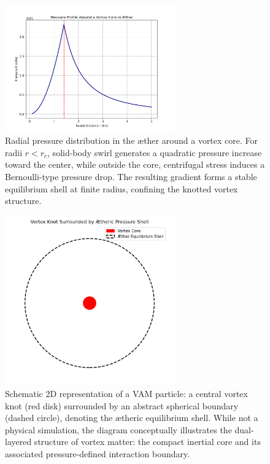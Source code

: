 \begin{figure}[h!]
    \centering
    \includegraphics[width=0.65\textwidth]{images/PressureProfileAroundCore}
    \caption{Radial pressure distribution in the æther around a vortex core.
    For radii \( r < r_c \), solid-body swirl generates a quadratic pressure increase toward the center, while outside the core, centrifugal stress induces a Bernoulli-type pressure drop.
    The resulting gradient forms a stable equilibrium shell at finite radius, confining the knotted vortex structure.}
\end{figure}

\begin{figure}[h!]
    \centering
    \includegraphics[width=0.65\textwidth]{images/PressureProfileAroundCore2}
    \caption{Schematic 2D representation of a VAM particle: a central vortex knot (red disk) surrounded by an abstract spherical boundary (dashed circle), denoting the ætheric equilibrium shell. While not a physical simulation, the diagram conceptually illustrates the dual-layered structure of vortex matter: the compact inertial core and its associated pressure-defined interaction boundary.}
\end{figure}

